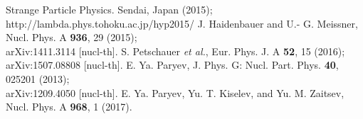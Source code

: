 \documentclass[12pt]{article}
\begin{document}
\begin{thebibliography}{99}
             Strange Particle Physics. Sendai, Japan (2015);\\
             http://lambda.phys.tohoku.ac.jp/hyp2015/
 J. Haidenbauer and U.- G. Meissner, Nucl. Phys. A {\bf 936}, 29 (2015);\\                                     arXiv:1411.3114 [nucl-th].
 S. Petschauer {\it et al.}, Eur. Phys. J. A {\bf 52}, 15 (2016);\\
                                   arXiv:1507.08808 [nucl-th].
 E. Ya. Paryev, J. Phys. G: Nucl. Part. Phys. {\bf 40}, 025201 (2013);\\
                                   arXiv:1209.4050 [nucl-th].
 E. Ya. Paryev, Yu. T. Kiselev, and Yu. M. Zaitsev, Nucl. Phys. A {\bf 968}, 1 (2017).
\end{thebibliography}
\end{document}
